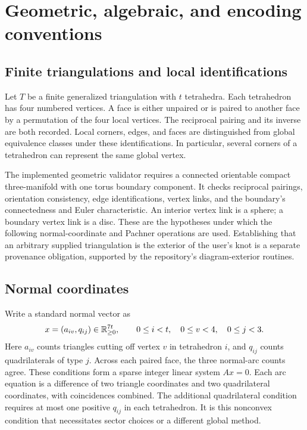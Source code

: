 \section{Geometric, algebraic, and encoding conventions}

\subsection{Finite triangulations and local identifications}

Let $T$ be a finite generalized triangulation with $t$ tetrahedra. Each
tetrahedron has four numbered vertices. A face is either unpaired or is
paired to another face by a permutation of the four local vertices.
The reciprocal pairing and its inverse are both recorded. Local corners,
edges, and faces are distinguished from global equivalence classes under
these identifications. In particular, several corners of a tetrahedron
can represent the same global vertex.

The implemented geometric validator requires a connected orientable
compact three-manifold with one torus boundary component. It checks
reciprocal pairings, orientation consistency, edge identifications,
vertex links, and the boundary's connectedness and Euler characteristic.
An interior vertex link is a sphere; a boundary vertex link is a disc.
These are the hypotheses under which the following normal-coordinate and
Pachner operations are used. Establishing that an arbitrary supplied
triangulation is the exterior of the user's knot is a separate provenance
obligation, supported by the repository's diagram-exterior routines.

\subsection{Normal coordinates}

Write a standard normal vector as
\[
 x=(a_{iv},q_{ij})\in\mathbb R_{\ge0}^{7t},
 \qquad 0\le i<t,\quad 0\le v<4,\quad 0\le j<3.
\]
Here $a_{iv}$ counts triangles cutting off vertex $v$ in tetrahedron $i$,
and $q_{ij}$ counts quadrilaterals of type $j$. Across each paired face,
the three normal-arc counts agree. These conditions form a sparse integer
linear system $Ax=0$. Each arc equation is a difference of two triangle
coordinates and two quadrilateral coordinates, with coincidences combined.
The additional quadrilateral condition requires at most one positive
$q_{ij}$ in each tetrahedron. It is this nonconvex condition that necessitates
sector choices or a different global method.

